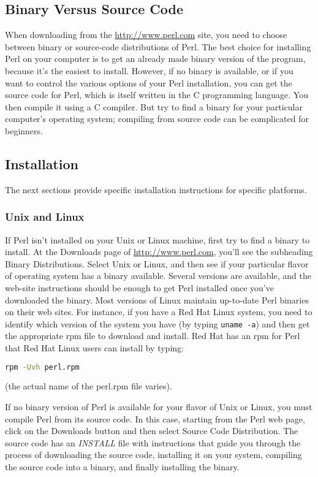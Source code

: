 \subsection{Binary Versus Source Code}
When downloading from the \href{http://www.perl.com}{http://www.perl.com} site, you need to choose between binary or source-code distributions of Perl. The best choice for installing Perl on your computer is to get an already made binary version of the program, because it's the easiest to install. However, if no binary is available, or if you want to control the various options of your Perl installation, you can get the source code for Perl, which is itself written in the C programming language. You then compile it using a C compiler. But try to find a binary for your particular computer's operating system; compiling from source code can be complicated for beginners. 

\subsection{Installation}
The next sections provide specific installation instructions for specific platforms.

\subsubsection{Unix and Linux}
If Perl isn't installed on your Unix or Linux machine, first try to find a binary to install. At the Downloads page of \href{http://www.perl.com}{http://www.perl.com}, you'll see the subheading Binary Distributions. Select Unix or Linux, and then see if your particular flavor of operating system has a binary available.  Several versions are available, and the web-site instructions should be enough to get Perl installed once you've downloaded the binary. Most versions of Linux maintain up-to-date Perl binaries on their web sites.  For instance, if you have a Red Hat Linux system, you need to identify which version of the system you have (by typing \verb|uname -a|) and then get the appropriate rpm file to download and install. Red Hat has an rpm for Perl that Red Hat Linux users can install by typing: 

\begin{lstlisting}[language=bash]
rpm -Uvh perl.rpm
\end{lstlisting}

(the actual name of the perl.rpm file varies).

If no binary version of Perl is available for your flavor of Unix or Linux, you must compile Perl from its source code. In this case, starting from the Perl web page, click on the Downloads button and then select Source Code Distribution. The source code has an \textit{INSTALL} file with instructions that guide you through the process of downloading the source code, installing it on your system, compiling the source code into a binary, and finally installing the binary.  


